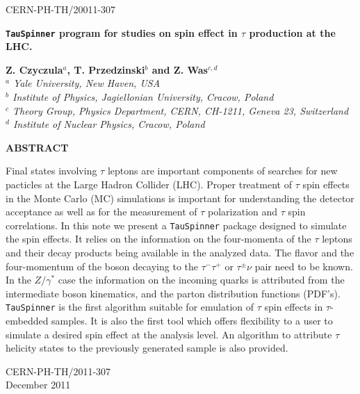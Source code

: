\documentclass[12pt]{article}
\def\TauNu{\ensuremath{\tau^{\pm}\nu}\xspace}
\def\TauTau{\ensuremath{\tau^{-}\tau^{+}}\xspace}
\def\Tau{\ensuremath{\tau}\xspace}
\begin{document}
\begin{titlepage}
\begin{flushright}
{ CERN-PH-TH/20011-307}
\end{flushright}

\vspace{0.2cm}
\begin{center}
{\Huge \bf {\tt TauSpinner} program for studies on spin effect in $\tau$
  production at the LHC.}
\end{center}

\vspace*{5mm}

\begin{center}
{\bf {Z. Czyczula}$^a$,
{T. Przedzinski}$^b$ and
{Z. Was}$^{c,d}$} \\

{\em $^a$ Yale University, New Haven, USA} \\
{\em $^b$ Institute of Physics, Jagiellonian University, Cracow, Poland} \\
{\em $^c$ Theory Group, Physics Department, CERN, CH-1211, Geneva 23, Switzerland} \\
{\em $^d$ Institute of Nuclear Physics, Cracow, Poland}
\end{center}


\vspace{.1 cm}
\begin{center}
{\bf   ABSTRACT  }
\end{center}
{
Final states involving \Tau leptons are important components of
searches for new pacticles at the Large Hadron Collider (LHC). 
Proper treatment of \Tau spin
effects in the Monte Carlo (MC) simulations is important for
understanding the detector acceptance as well as for 
the measurement of \Tau polarization and \Tau spin correlations.
In this note we present a {\tt TauSpinner} package designed 
to simulate the spin effects. It relies on the information
on the four-momenta of the \Tau leptons and their decay 
products being available in the analyzed data. 
The flavor and the four-momentum of the boson decaying to the \TauTau or
\TauNu pair need to be known. In the $Z/\gamma^*$ case the information on the incoming
quarks is attributed from the intermediate boson
kinematics, and the parton distribution functions (PDF's).
{\tt TauSpinner} is the first algorithm suitable for emulation of \Tau spin effects
in \Tau-embedded samples. It is also the first tool which offers flexibility to a user
to simulate a desired spin effect at the analysis level. An algorithm to attribute $\tau$  helicity states to the previously generated sample is also provided.
}

\vspace{ 1 cm}
\begin{flushleft}
CERN-PH-TH/2011-307 \\
December 2011
\end{flushleft}

\end{titlepage}
\end{document}
